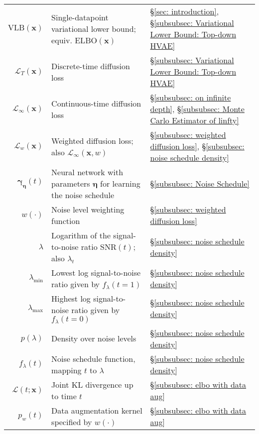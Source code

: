 \begin{table}[!h]
\begin{tabular}{rll}
        $\mathrm{VLB}(\mathbf{x})$ & Single-datapoint variational lower bound; equiv. $\mathrm{ELBO}(\mathbf{x})$ & \S\ref{sec: introduction}, \S\ref{subsubsec: Variational Lower Bound: Top-down HVAE} \\[5pt]
        $\mathcal{L}_T(\mathbf{x})$ & Discrete-time diffusion loss & \S\ref{subsubsec: Variational Lower Bound: Top-down HVAE} \\[5pt]
        $\mathcal{L}_{\infty}(\mathbf{x})$ & Continuous-time diffusion loss & \S\ref{subsubsec: on infinite depth}, \S\ref{subsubsec: Monte Carlo Estimator of linfty} \\[5pt]
        $\mathcal{L}_w(\mathbf{x})$ & Weighted diffusion loss; also $\mathcal{L}_{\infty}(\mathbf{x}, w)$ & \S\ref{subsubsec: weighted diffusion loss}, \S\ref{subsubsec: noise schedule density} \\[5pt]
        $\boldsymbol{\gamma}_{\boldsymbol{\eta}}(t)$ & Neural network with parameters $\boldsymbol{\eta}$ for learning the noise schedule & \S\ref{subsubsec: Noise Schedule} \\[5pt]
        $w(\cdot)$ & Noise level weighting function & \S\ref{subsubsec: weighted diffusion loss} \\[5pt]
        $\lambda$ & Logarithm of the signal-to-noise ratio $\mathrm{SNR}(t)$; also $\lambda_t$ & \S\ref{subsubsec: noise schedule density} \\[5pt]
        $\lambda_{\mathrm{min}}$ & Lowest log signal-to-noise ratio given by $f_\lambda(t=1)$ & \S\ref{subsubsec: noise schedule density} \\[5pt]
        $\lambda_{\mathrm{max}}$ & Highest log signal-to-noise ratio given by $f_\lambda(t=0)$ & \S\ref{subsubsec: noise schedule density} \\[5pt]
        $p(\lambda)$ & Density over noise levels & \S\ref{subsubsec: noise schedule density} \\[5pt]
        $f_\lambda(t)$ & Noise schedule function, mapping $t$ to $\lambda$ & \S\ref{subsubsec: noise schedule density} \\[5pt]
        $\mathcal{L}(t;\mathbf{x})$ & Joint KL divergence up to time $t$ & \S\ref{subsubsec: elbo with data aug} \\[5pt]
        $p_w(t)$ & Data augmentation kernel specified by $w(\cdot)$ & \S\ref{subsubsec: elbo with data aug}
    \end{tabular}
\end{table}